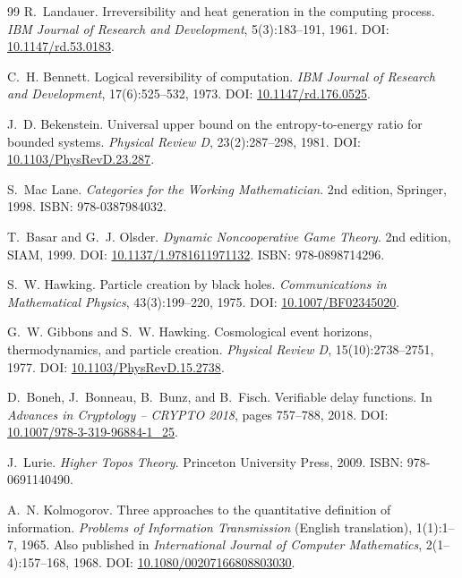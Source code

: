 \documentclass[11pt,a4paper]{article}
\theoremstyle{definition}
\theoremstyle{remark}
\begin{document}
\begin{thebibliography}{99}
R.~Landauer.
\newblock Irreversibility and heat generation in the computing process.
\newblock \emph{IBM Journal of Research and Development}, 5(3):183--191, 1961.
\newblock DOI: \href{https://doi.org/10.1147/rd.53.0183}{10.1147/rd.53.0183}.

C.~H. Bennett.
\newblock Logical reversibility of computation.
\newblock \emph{IBM Journal of Research and Development}, 17(6):525--532, 1973.
\newblock DOI: \href{https://doi.org/10.1147/rd.176.0525}{10.1147/rd.176.0525}.

J.~D. Bekenstein.
\newblock Universal upper bound on the entropy-to-energy ratio for bounded systems.
\newblock \emph{Physical Review D}, 23(2):287--298, 1981.
\newblock DOI: \href{https://doi.org/10.1103/PhysRevD.23.287}{10.1103/PhysRevD.23.287}.

S.~Mac Lane.
\newblock \emph{Categories for the Working Mathematician}.
\newblock 2nd edition, Springer, 1998.
\newblock ISBN: 978-0387984032.

T.~Basar and G.~J. Olsder.
\newblock \emph{Dynamic Noncooperative Game Theory}.
\newblock 2nd edition, SIAM, 1999.
\newblock DOI: \href{https://doi.org/10.1137/1.9781611971132}{10.1137/1.9781611971132}.
\newblock ISBN: 978-0898714296.

S.~W. Hawking.
\newblock Particle creation by black holes.
\newblock \emph{Communications in Mathematical Physics}, 43(3):199--220, 1975.
\newblock DOI: \href{https://doi.org/10.1007/BF02345020}{10.1007/BF02345020}.

G.~W. Gibbons and S.~W. Hawking.
\newblock Cosmological event horizons, thermodynamics, and particle creation.
\newblock \emph{Physical Review D}, 15(10):2738--2751, 1977.
\newblock DOI: \href{https://doi.org/10.1103/PhysRevD.15.2738}{10.1103/PhysRevD.15.2738}.

D.~Boneh, J.~Bonneau, B.~Bunz, and B.~Fisch.
\newblock Verifiable delay functions.
\newblock In \emph{Advances in Cryptology -- CRYPTO 2018}, pages 757--788, 2018.
\newblock DOI: \href{https://doi.org/10.1007/978-3-319-96884-1_25}{10.1007/978-3-319-96884-1\_25}.

J.~Lurie.
\newblock \emph{Higher Topos Theory}.
\newblock Princeton University Press, 2009.
\newblock ISBN: 978-0691140490.

A.~N. Kolmogorov.
\newblock Three approaches to the quantitative definition of information.
\newblock \emph{Problems of Information Transmission} (English translation), 1(1):1--7, 1965.
\newblock Also published in \emph{International Journal of Computer Mathematics}, 2(1--4):157--168, 1968.
\newblock DOI: \href{https://doi.org/10.1080/00207166808803030}{10.1080/00207166808803030}.


\end{thebibliography}
\end{document}

